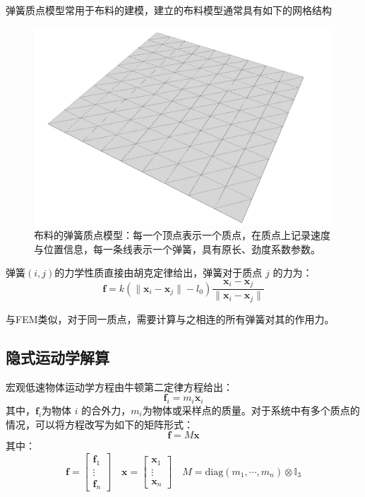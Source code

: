 弹簧质点模型常用于布料的建模，建立的布料模型通常具有如下的网格结构
\begin{figure}[hbt]
\centering
  \includegraphics[width=0.4\linewidth]{img/Screenshot 2023-04-19 at 18.56.20.png}
  \caption{布料的弹簧质点模型：每一个顶点表示一个质点，在质点上记录速度与位置信息，每一条线表示一个弹簧，具有原长、劲度系数参数。}
\end{figure}

弹簧$(i, j)$的力学性质直接由胡克定律给出，弹簧对于质点 $j$ 的力为：
\begin{equation}
  \mathbf f = k(\| \mathbf x_i - \mathbf x_j\| - l_0) \frac{\mathbf x_i - \mathbf x_j}{\|\mathbf x_i - \mathbf x_j\|}
\end{equation}

与FEM类似，对于同一质点，需要计算与之相连的所有弹簧对其的作用力。

\subsection{隐式运动学解算}

宏观低速物体运动学方程由牛顿第二定律方程给出：
\begin{equation}
  \label{eq:newton2nd}
  \mathbf f_i = m_i \ddot{\mathbf x}_i
\end{equation}
其中，$\mathbf f_i$为物体 $i$ 的合外力，$m_i$为物体或采样点的质量。对于系统中有多个质点的情况，可以将方程改写为如下的矩阵形式：
\begin{equation}
  \label{eq:newton2nd-mat}
  {\mathbf f }= M{\mathbf x}
\end{equation}
其中：
$$
{\mathbf f} = \begin{bmatrix}
  \mathbf f_1\\
  \vdots\\
  \mathbf f_n
\end{bmatrix}\quad
\mathbf x =  \begin{bmatrix}
  \mathbf x_1\\
  \vdots\\
  \mathbf x_n
\end{bmatrix}\quad
M =\mathrm{diag}(m_1, \cdots, m_n)\otimes \mathbb I_3
$$

